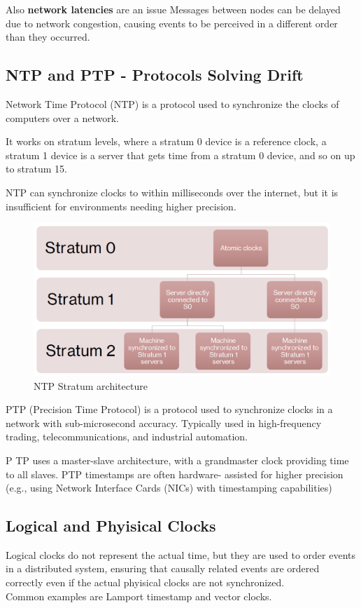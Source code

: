 Also \textbf{network latencies} are an issue
Messages between nodes can be delayed due to network congestion, causing events to be perceived in a different order than they occurred.

\subsection{NTP and PTP - Protocols Solving Drift}
\begin{paracol}{2}
   Network Time Protocol (NTP) is a protocol used to synchronize the clocks of computers over a network.

   It works on stratum levels, where a stratum 0 device is a reference clock, a stratum 1 device is a server that gets time from a stratum 0 device, and so on up to stratum 15.
   
   NTP can synchronize clocks to within milliseconds over the internet, but it is insufficient for environments needing higher precision.
   \switchcolumn
   \begin{figure}[htbp]
      \centering
      \includegraphics{images/03/ntp.png}
      \caption{NTP Stratum architecture}
      \label{fig:03/ntp}
   \end{figure}
\end{paracol}

PTP (Precision Time Protocol) is a protocol used to synchronize clocks in a network with sub-microsecond accuracy. Typically used in high-frequency trading, telecommunications, and industrial automation.

P TP uses a master-slave architecture, with a grandmaster clock providing time to all slaves.
PTP timestamps are often hardware- assisted for higher precision (e.g., using Network Interface Cards (NICs) with timestamping capabilities)


\subsection{Logical and Phyisical Clocks}
Logical clocks do not represent the actual time, but they are used to order events in a distributed system, ensuring that causally related events are ordered correctly even if the actual phyisical clocks are not synchronized.\\
Common examples are Lamport timestamp and vector clocks.